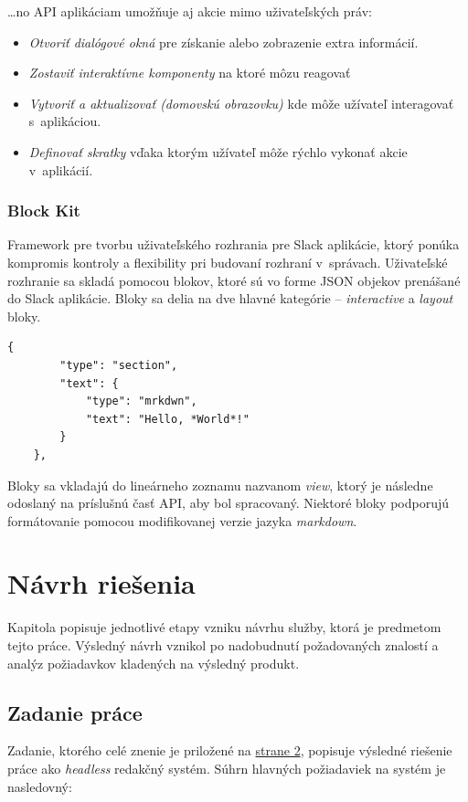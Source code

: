 \ldots no API aplikáciam umožňuje aj akcie mimo uživateľských práv:

\begin{itemize}
	\item \emph{Otvoriť dialógové okná} pre získanie alebo zobrazenie extra informácií. \cite{SlackAPI}
	\item \emph{Zostaviť interaktívne komponenty} na ktoré môzu reagovať \cite{SlackAPI}
	\item \emph{Vytvoriť a aktualizovať  (domovskú obrazovku)} kde môže užívateľ interagovať s~aplikáciou. \cite{SlackAPI}
	\item \emph{Definovať skratky} vďaka ktorým užívateľ môže rýchlo vykonať akcie v~aplikácií. \cite{SlackAPI}
\end{itemize}

\subsection{Block Kit}
Framework pre tvorbu uživateľského rozhrania pre Slack aplikácie, ktorý ponúka kompromis kontroly a flexibility pri budovaní rozhraní v~správach. \cite{SlackAPI}  Uživateľské rozhranie sa skladá pomocou blokov, ktoré sú vo forme JSON objekov prenášané do Slack aplikácie. Bloky sa delia na dve hlavné kategórie -- \emph{interactive} a \emph{layout} bloky. \\

\begin{lstlisting}[caption=Príklad jednoduchého bloku v~Slack aplikácií.]
	{
		"type": "section",
		"text": {
			"type": "mrkdwn",
			"text": "Hello, *World*!"
		}
	},
\end{lstlisting}

\bigskip

\noindent Bloky sa vkladajú do lineárneho zoznamu nazvanom \emph{view}, ktorý je následne odoslaný na príslušnú časť API, aby bol spracovaný. Niektoré bloky podporujú formátovanie pomocou modifikovanej verzie jazyka \emph{markdown}.

\chapter{Návrh riešenia}
Kapitola popisuje jednotlivé etapy vzniku návrhu služby, ktorá je predmetom tejto práce. Výsledný návrh vznikol po nadobudnutí požadovaných znalostí a analýz požiadavkov kladených na výsledný produkt.

\section{Zadanie práce}
Zadanie, ktorého celé znenie je priložené na \hyperlink{page.2}{strane 2}, popisuje výsledné riešenie práce ako \emph{headless} redakčný systém. Súhrn hlavných požiadaviek na systém je nasledovný:

